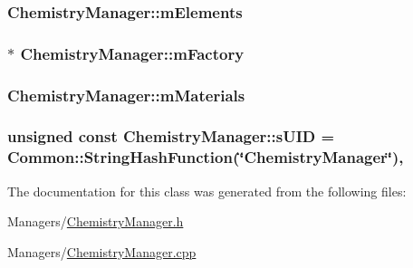 \subsubsection[{\texorpdfstring{m\+Elements}{mElements}}]{ Chemistry\+Manager\+::m\+Elements\hspace{0.3cm}{\ttfamily [private]}}\hypertarget{classChemistryManager_a206bd337c1434f05f699f43e3b76ddc2}{}\label{classChemistryManager_a206bd337c1434f05f699f43e3b76ddc2}
\subsubsection[{\texorpdfstring{m\+Factory}{mFactory}}]{$\ast$ Chemistry\+Manager\+::m\+Factory\hspace{0.3cm}{\ttfamily [private]}}\hypertarget{classChemistryManager_aa22d3fda73de4f1c415c6d324bffd8a8}{}\label{classChemistryManager_aa22d3fda73de4f1c415c6d324bffd8a8}
\subsubsection[{\texorpdfstring{m\+Materials}{mMaterials}}]{ Chemistry\+Manager\+::m\+Materials\hspace{0.3cm}{\ttfamily [private]}}\hypertarget{classChemistryManager_a74ebac5a1fad5be1176f61e53620dc01}{}\label{classChemistryManager_a74ebac5a1fad5be1176f61e53620dc01}
\subsubsection[{\texorpdfstring{s\+U\+ID}{sUID}}]{\setlength{\rightskip}{0pt plus 5cm}unsigned const Chemistry\+Manager\+::s\+U\+ID = {\bf Common\+::\+String\+Hash\+Function}(\char`\"{}Chemistry\+Manager\char`\"{})\hspace{0.3cm}{\ttfamily [static]}, {\ttfamily [private]}}\hypertarget{classChemistryManager_a175125416f540c77e81629fd9d38a60a}{}\label{classChemistryManager_a175125416f540c77e81629fd9d38a60a}


The documentation for this class was generated from the following files\+:\begin{DoxyCompactItemize}
\item 
Managers/\hyperlink{ChemistryManager_8h}{Chemistry\+Manager.\+h}\item 
Managers/\hyperlink{ChemistryManager_8cpp}{Chemistry\+Manager.\+cpp}\end{DoxyCompactItemize}
